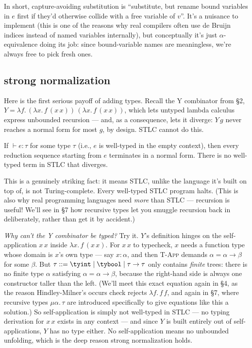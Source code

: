 In short, capture-avoiding substitution is ``substitute, but rename bound variables in $e$ first if they'd otherwise collide with a free variable of $v$''. It's a nuisance to implement (this is one of the reasons why real compilers often use de Bruijn indices instead of named variables internally), but conceptually it's just $\alpha$-equivalence doing its job: since bound-variable names are meaningless, we're always free to pick fresh ones.

\subsection{strong normalization}

Here is the first serious payoff of adding types. Recall the Y combinator from \S2, $Y = \lambda f.\,(\lambda x.\, f\,(x\, x))\,(\lambda x.\, f\,(x\, x))$, which lets untyped lambda calculus express unbounded recursion — and, as a consequence, lets it diverge: $Y\,g$ never reaches a normal form for most $g$, by design. STLC cannot do this.

\begin{theorem}
If $\vdash e : \tau$ for some type $\tau$ (i.e., $e$ is well-typed in the empty context), then every reduction sequence starting from $e$ terminates in a normal form. There is no well-typed term in STLC that diverges.
\end{theorem}

This is a genuinely striking fact: it means STLC, unlike the language it's built on top of, is not Turing-complete. Every well-typed STLC program halts. (This is also why real programming languages need \emph{more} than STLC — recursion is useful! We'll see in \S7 how recursive types let you smuggle recursion back in deliberately, rather than get it by accident.)

\emph{Why can't the Y combinator be typed?} Try it. $Y$'s definition hinges on the self-application $x\, x$ inside $\lambda x.\, f\,(x\,x)$. For $x\,x$ to typecheck, $x$ needs a function type whose domain is $x$'s own type — say $x : \alpha$, and then \textsc{T-App} demands $\alpha = \alpha \to \beta$ for some $\beta$. But $\tau ::= \tyint \mid \tybool \mid \tau \to \tau$ only contains \emph{finite} trees: there is no finite type $\alpha$ satisfying $\alpha = \alpha \to \beta$, because the right-hand side is always one constructor taller than the left. (We'll meet this exact equation again in \S4, as the reason Hindley-Milner's occurs check rejects $\lambda f.\,f\,f$, and again in \S7, where recursive types $\mu\alpha.\,\tau$ are introduced specifically to give equations like this a solution.) So self-application is simply not well-typed in STLC — no typing derivation for $x\,x$ exists in any context — and since $Y$ is built entirely out of self-applications, $Y$ has no type either. No self-application means no unbounded unfolding, which is the deep reason strong normalization holds.

